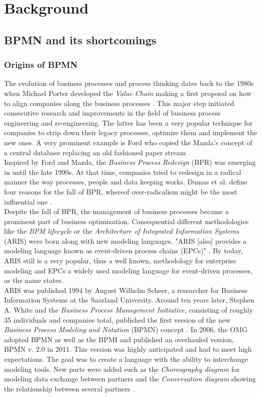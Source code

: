 \chapter{Background}
\label{chapter:Background}

\section{BPMN and its shortcomings}
\subsection{Origins of BPMN}
The evolution of business processes and process thinking dates back to the 1980s when Michael Porter developed the \textit{Value Chain} making a first proposal on how to align companies along the business processes \cite{Porter1988}. 
This major step initiated consecutive research and improvements in the field of business process engineering and re-engineering. The latter has been a very popular technique for companies to strip down their legacy processes, optimize them and implement the new ones. A very prominent example is Ford who copied the Mazda's concept of a central database replacing an old fashioned paper stream \cite{Dumas2013}. \\
Inspired by Ford and Mazda, the \textit{Business Process Redesign} (BPR) was emerging in until the late 1990s. At that time, companies tried to redesign in a radical manner the way processes, people and data keeping works. Dumas et al. define four reasons for the fall of BPR, whereof over-radicalism might be the most influential one \cite{Dumas2013}. \\

Despite the fall of BPR, the management of business processes became a prominent part of business optimization. Consequential different methodologies like the \textit{BPM lifecycle} or the \textit{Architecture of Integrated Information Systems} (ARIS) were born along with new modeling languages. "ARIS [also] provides a modeling language known as event-driven process chains (EPCs)" \cite{Lankhorst2009}. By today, ARIS still is a very popular, thus a well known, methodology for enterprise modeling and EPCs a widely used modeling language for event-driven processes, as the name states. \\
ARIS was published 1994 by August Wilhelm Scheer, a researcher for Business Information Systems at the Saarland University. Around ten years later, Stephen A. White and the \textit{Business Process Management Initiative}, consisting of roughly 35 individuals and companies total, published the first version of the new \textit{Business Process Modeling and Notation} (BPMN) concept \cite{Allweyer2010}. In 2006, the OMG adopted BPMN as well as the BPMI and published an overhauled version, BPMN v. 2.0 in 2011. This version was highly anticipated and had to meet high expectations. The goal was to create a language with the ability to interchange modeling tools. New parts were added such as the \textit{Choreography diagram} for modeling data exchange between partners and the \textit{Conversation diagram} showing the relationship between several partners \cite{Allweyer2010}. 

